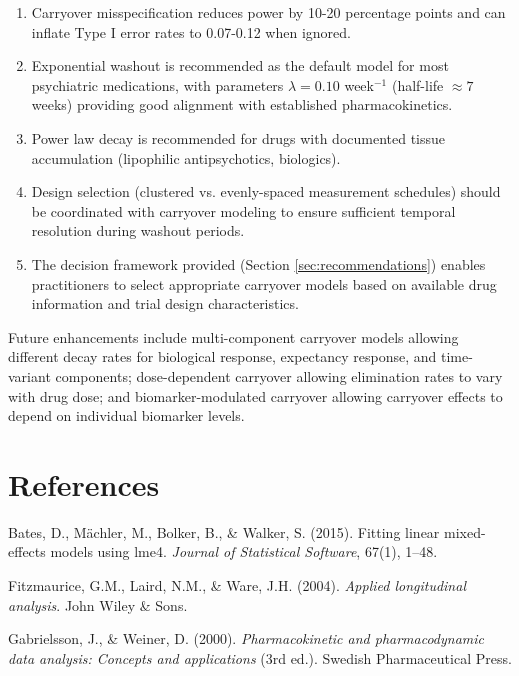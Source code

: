 \documentclass[11pt,a4paper]{article}
\begin{document}
\begin{enumerate}
  \item Carryover misspecification reduces power by 10-20 percentage points and can inflate Type I error rates to 0.07-0.12 when ignored.

  \item Exponential washout is recommended as the default model for most psychiatric medications, with parameters $\lambda = 0.10$ week$^{-1}$ (half-life $\approx 7$ weeks) providing good alignment with established pharmacokinetics.

  \item Power law decay is recommended for drugs with documented tissue accumulation (lipophilic antipsychotics, biologics).

  \item Design selection (clustered vs. evenly-spaced measurement schedules) should be coordinated with carryover modeling to ensure sufficient temporal resolution during washout periods.

  \item The decision framework provided (Section \ref{sec:recommendations}) enables practitioners to select appropriate carryover models based on available drug information and trial design characteristics.

\end{enumerate}

Future enhancements include multi-component carryover models allowing different decay rates for biological response, expectancy response, and time-variant components; dose-dependent carryover allowing elimination rates to vary with drug dose; and biomarker-modulated carryover allowing carryover effects to depend on individual biomarker levels.

\newpage

\section*{References}

Bates, D., M\"achler, M., Bolker, B., \& Walker, S. (2015). Fitting linear mixed-effects models using lme4. \textit{Journal of Statistical Software}, 67(1), 1--48.

Fitzmaurice, G.M., Laird, N.M., \& Ware, J.H. (2004). \textit{Applied longitudinal analysis}. John Wiley \& Sons.

Gabrielsson, J., \& Weiner, D. (2000). \textit{Pharmacokinetic and pharmacodynamic data analysis: Concepts and applications} (3rd ed.). Swedish Pharmaceutical Press.
\end{document}
